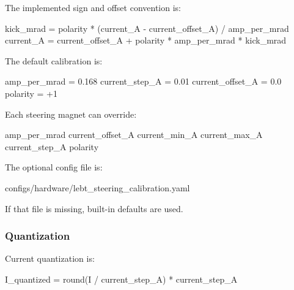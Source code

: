 \documentclass[
]{article}
\newenvironment{Shaded}{}{}
\newcommand{\NormalTok}[1]{#1}
\begin{document}
The implemented sign and offset convention is:

\begin{Shaded}
\begin{Highlighting}[]
\NormalTok{kick\_mrad = polarity * (current\_A {-} current\_offset\_A) / amp\_per\_mrad}
\NormalTok{current\_A = current\_offset\_A + polarity * amp\_per\_mrad * kick\_mrad}
\end{Highlighting}
\end{Shaded}

The default calibration is:

\begin{Shaded}
\begin{Highlighting}[]
\NormalTok{amp\_per\_mrad = 0.168}
\NormalTok{current\_step\_A = 0.01}
\NormalTok{current\_offset\_A = 0.0}
\NormalTok{polarity = +1}
\end{Highlighting}
\end{Shaded}

Each steering magnet can override:

\begin{Shaded}
\begin{Highlighting}[]
\NormalTok{amp\_per\_mrad}
\NormalTok{current\_offset\_A}
\NormalTok{current\_min\_A}
\NormalTok{current\_max\_A}
\NormalTok{current\_step\_A}
\NormalTok{polarity}
\end{Highlighting}
\end{Shaded}

The optional config file is:

\begin{Shaded}
\begin{Highlighting}[]
\NormalTok{configs/hardware/lebt\_steering\_calibration.yaml}
\end{Highlighting}
\end{Shaded}

If that file is missing, built-in defaults are used.

\hypertarget{quantization}{%
\subsubsection{Quantization}\label{quantization}}

Current quantization is:

\begin{Shaded}
\begin{Highlighting}[]
\NormalTok{I\_quantized = round(I / current\_step\_A) * current\_step\_A}
\end{Highlighting}
\end{Shaded}
\end{document}
